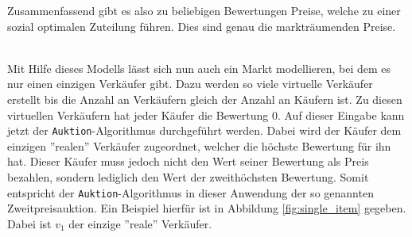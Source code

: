 \documentclass[a4paper]{scrreprt}
\theoremstyle{plain} %
\theoremstyle{definition} %
\begin{document}
\noindent
Zusammenfassend gibt es also zu beliebigen Bewertungen Preise, 
welche zu einer sozial optimalen Zuteilung führen. Dies sind genau die markträumenden Preise.


~\\
Mit Hilfe dieses Modells lässt sich nun auch ein Markt modellieren, bei dem es nur einen einzigen Verkäufer
gibt. Dazu werden so viele  virtuelle Verkäufer erstellt bis die Anzahl an Verkäufern gleich der Anzahl an Käufern ist.
Zu diesen virtuellen Verkäufern hat jeder Käufer die Bewertung 0. Auf dieser Eingabe kann jetzt der 
\texttt{Auktion}-Algorithmus durchgeführt werden. Dabei wird der Käufer dem einzigen ''realen'' Verkäufer
zugeordnet, welcher die höchste Bewertung für ihn hat. Dieser Käufer muss jedoch nicht den Wert seiner
Bewertung als Preis bezahlen, sondern lediglich den Wert der zweithöchsten Bewertung. 
Somit entspricht der \texttt{Auktion}-Algorithmus
in dieser Anwendung der so genannten Zweitpreisauktion. Ein Beispiel hierfür ist in Abbildung \ref{fig:single_item}
gegeben. Dabei ist $v_1$ der einzige ''reale'' Verkäufer. 
\end{document}
